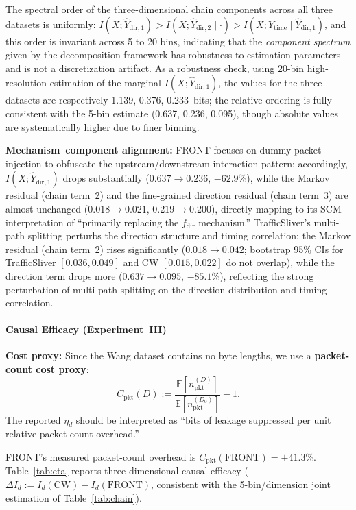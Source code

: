 \documentclass[lettersize,journal]{IEEEtran}
\begin{document}
The spectral order of the three-dimensional chain components across all
three datasets is uniformly:
$I(X;\hat{Y}_{\mathrm{dir},1}) > I(X;\hat{Y}_{\mathrm{dir},2}\mid\cdot)
> I(X;\hat{Y}_{\mathrm{time}}\mid\hat{Y}_{\mathrm{dir},1})$,
and this order is invariant across 5 to 20 bins, indicating that the
\emph{component spectrum} given by the decomposition framework has robustness
to estimation parameters and is not a discretization artifact.
As a robustness check, using 20-bin high-resolution estimation of the
marginal $I(X;\hat{Y}_{\mathrm{dir},1})$, the values for the three datasets
are respectively 1.139, 0.376, 0.233~bits; the relative ordering is fully
consistent with the 5-bin estimate (0.637, 0.236, 0.095), though absolute
values are systematically higher due to finer binning.

\textbf{Mechanism--component alignment:}
FRONT focuses on dummy packet injection to obfuscate the
upstream/downstream interaction pattern;
accordingly, $I(X;\hat{Y}_{\mathrm{dir},1})$ drops substantially
($0.637\to 0.236$, $-62.9\%$), while the Markov residual (chain term~2)
and the fine-grained direction residual (chain term~3) are almost
unchanged ($0.018\to 0.021$, $0.219\to 0.200$), directly mapping to its
SCM interpretation of ``primarily replacing the $f_{\mathrm{dir}}$
mechanism.''
TrafficSliver's multi-path splitting perturbs the direction structure and
timing correlation; the Markov residual (chain term~2) rises significantly
($0.018\to 0.042$; bootstrap 95\% CIs for TrafficSliver $[0.036,0.049]$
and CW $[0.015,0.022]$ do not overlap), while the direction term drops
more ($0.637\to 0.095$, $-85.1\%$), reflecting the strong perturbation
of multi-path splitting on the direction distribution and timing correlation.

\paragraph{Causal Efficacy (Experiment~III)}
\textbf{Cost proxy:} Since the Wang dataset contains no byte lengths,
we use a \textbf{packet-count cost proxy}:
\begin{equation}\label{def:cost-proxy}
C_{\mathrm{pkt}}(D) := \frac{\mathbb{E}[n^{(D)}_{\mathrm{pkt}}]}{\mathbb{E}[n^{(D_0)}_{\mathrm{pkt}}]} - 1.
\end{equation}
The reported $\eta_d$ should be interpreted as ``bits of leakage suppressed
per unit relative packet-count overhead.''

FRONT's measured packet-count overhead is $C_{\mathrm{pkt}}(\mathrm{FRONT})=+41.3\%$.
Table~\ref{tab:eta} reports three-dimensional causal efficacy
($\Delta I_d := I_d(\mathrm{CW}) - I_d(\mathrm{FRONT})$, consistent with
the 5-bin/dimension joint estimation of Table~\ref{tab:chain}).
\end{document}
